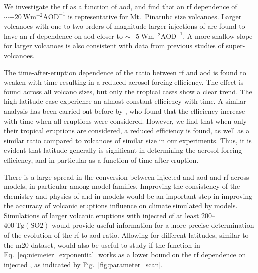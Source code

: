 \documentclass{ametsocV6.1}
\newcommand{\iso}[1][i]{{#1}njected \ce{SO2}}
\begin{document}
We investigate the \gls{rf} as a function of \gls{aod}, and find that an \gls{rf}
dependence of \(\sim\SI{-20}{\watt\metre^{-2}\mathrm{AOD}^{-1}}\) is representative for
Mt.\ Pinatubo size volcanoes. Larger volcanoes with one to two orders of magnitude
larger injections of  are found to have an \gls{rf} dependence on \gls{aod}
closer to \(\sim \SI{-5}{\watt\metre^{-2}\mathrm{AOD}^{-1}}\). A more shallow slope for
larger volcanoes is also consistent with data from previous studies of super-volcanoes.

The time-after-eruption dependence of the ratio between \gls{rf} and \gls{aod} is found
to weaken with time resulting in a reduced aerosol forcing efficiency. The effect is
found across all volcano sizes, but only the tropical cases show a clear trend. The
high-latitude case experience an almost constant efficiency with time. A similar
analysis has been carried out before by \citet{marshall2020}, who found that the
efficiency increase with time when all eruptions were considered. However, we find that
when only their tropical eruptions are considered, a reduced efficiency is found, as
well as a similar ratio compared to volcanoes of similar size in our experiments. Thus,
it is evident that latitude generally is significant in determining the aerosol forcing
efficiency, and in particular as a function of time-after-eruption.

There is a large spread in the conversion between \iso{} and \gls{aod} and \gls{rf}
across models, in particular among model families. Improving the consistency of the
chemistry and physics of  and  in models would be an important step in
improving the accuracy of volcanic eruptions influence on climate simulated by models.
Simulations of larger volcanic eruptions with \iso{} of at least
\(200\)--\(\SI{400}{\tera\gram(\mathrm{SO2})}\) would provide useful information for a
more precise determination of the evolution of the \gls{rf} to \gls{aod} ratio. Allowing
for different latitudes, similar to the \gls{m20} dataset, would also be useful to study
if the function in Eq.~\ref{eq:niemeier_exponential} works as a lower bound on the
\gls{rf} dependence on \iso{}, as indicated by Fig.~\ref{fig:parameter_scan}.

\clearpage
\acknowledgments{}
\end{document}
